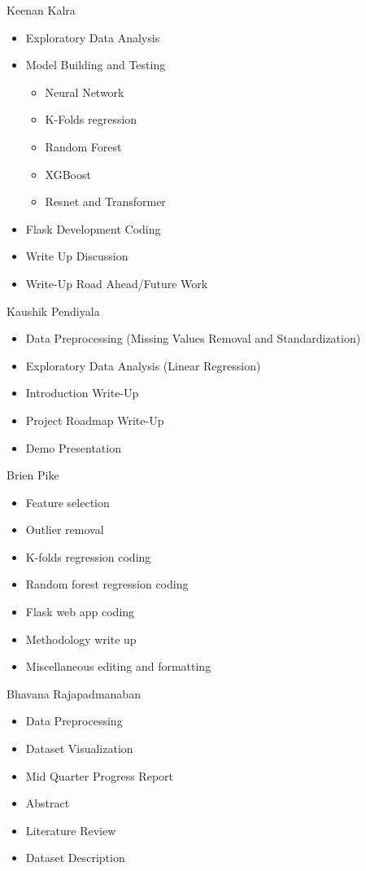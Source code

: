 \documentclass[conference, 11pt]{IEEEtran}
\begin{document}
Keenan Kalra 
\begin{itemize}
    \item Exploratory Data Analysis
    \item Model Building and Testing
        \begin{itemize}
            \item Neural Network
            \item K-Folds regression
            \item Random Forest
            \item XGBoost
            \item Resnet and Transformer
        \end{itemize}
    \item Flask Development Coding
    \item Write Up Discussion
    \item Write-Up Road Ahead/Future Work
\end{itemize}
\vspace{0.1in}

Kaushik Pendiyala
\begin{itemize}
    \item Data Preprocessing (Missing Values Removal and Standardization)
    \item Exploratory Data Analysis (Linear Regression)
    \item Introduction Write-Up
    \item Project Roadmap Write-Up
    \item Demo Presentation
\end{itemize}
\vspace{0.1in}

Brien Pike
\begin{itemize}
    \item Feature selection
    \item Outlier removal
    \item K-folds regression coding
    \item Random forest regression coding
    \item Flask web app coding
    \item Methodology write up
    \item Miscellaneous editing and formatting 
\end{itemize}
\vspace{0.1in}

Bhavana Rajapadmanaban
\begin{itemize}
    \item Data Preprocessing
    \item Dataset Visualization
    \item Mid Quarter Progress Report
    \item Abstract
    \item Literature Review
    \item Dataset Description
\end{itemize}
\vspace{0.1in}
\end{document}
